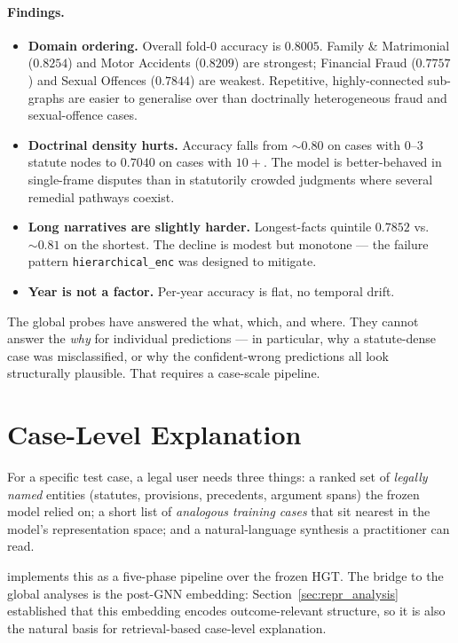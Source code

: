 \paragraph{Findings.}
\begin{itemize}
  \item \textbf{Domain ordering.} Overall fold-0 accuracy is $0.8005$. Family \& Matrimonial ($0.8254$) and Motor Accidents ($0.8209$) are strongest; Financial Fraud ($0.7757$) and Sexual Offences ($0.7844$) are weakest. Repetitive, highly-connected sub-graphs are easier to generalise over than doctrinally heterogeneous fraud and sexual-offence cases.
  \item \textbf{Doctrinal density hurts.} Accuracy falls from $\sim\!0.80$ on cases with 0--3 statute nodes to $0.7040$ on cases with $10+$. The model is better-behaved in single-frame disputes than in statutorily crowded judgments where several remedial pathways coexist.
  \item \textbf{Long narratives are slightly harder.} Longest-facts quintile $0.7852$ vs.\ $\sim\!0.81$ on the shortest. The decline is modest but monotone --- the failure pattern \texttt{hierarchical\_enc} was designed to mitigate.
  \item \textbf{Year is not a factor.} Per-year accuracy is flat, no temporal drift.
\end{itemize}

The global probes have answered the what, which, and where. They cannot answer the \emph{why} for individual predictions --- in particular, why a statute-dense case was misclassified, or why the confident-wrong predictions all look structurally plausible. That requires a case-scale pipeline.

\section{Case-Level Explanation}
\label{sec:case_pipeline}

For a specific test case, a legal user needs three things: a ranked set of \emph{legally named} entities (statutes, provisions, precedents, argument spans) the frozen model relied on; a short list of \emph{analogous training cases} that sit nearest in the model's representation space; and a natural-language synthesis a practitioner can read.

 implements this as a five-phase pipeline over the frozen HGT. The bridge to the global analyses is the post-GNN embedding: Section~\ref{sec:repr_analysis} established that this embedding encodes outcome-relevant structure, so it is also the natural basis for retrieval-based case-level explanation.

